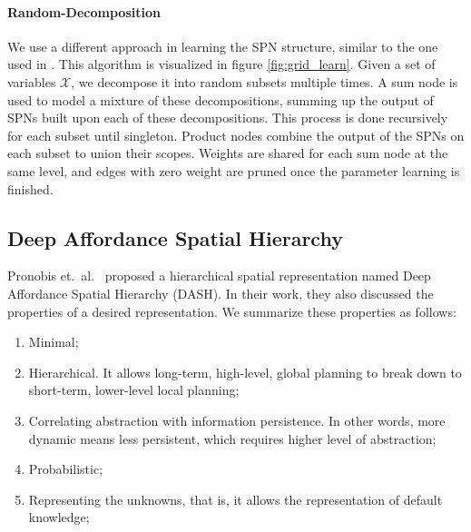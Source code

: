 \documentclass[11pt, titlepage]{article}
\theoremstyle{definition}
\begin{document}
\paragraph{Random-Decomposition}\label{sc:rand}
We use a different approach in learning the SPN structure, similar to the one used in \cite{pronobis2016learning}. This algorithm is visualized in figure \ref{fig:grid_learn}. Given a set of variables $\mathcal{X}$, we decompose it into random subsets multiple times. A sum node is used to model a mixture of these decompositions, summing up the output of SPNs built upon each of these decompositions. This process is done recursively for each subset until singleton. Product nodes combine the output of the SPNs on each subset to union their scopes. Weights are shared for each sum node at the same level, and edges with zero weight are pruned once the parameter learning is finished.

\subsection{Deep Affordance Spatial Hierarchy}\label{section:dash}

Pronobis et.~al.~\cite{pronobis2017deep} proposed a hierarchical spatial representation named Deep Affordance Spatial Hierarchy (DASH). In their work, they also discussed the properties of a desired representation. We summarize these properties as follows: 

\begin{enumerate}[label=(\arabic*)]
    \item Minimal;
    \item Hierarchical. It allows long-term, high-level, global planning to break down to short-term, lower-level local planning;
    \item Correlating abstraction with information persistence. In other words, more dynamic means less persistent, which requires higher level of abstraction;
    \item Probabilistic;
    \item Representing the unknowns, that is, it allows the representation of default knowledge;
\end{enumerate}
\end{document}
